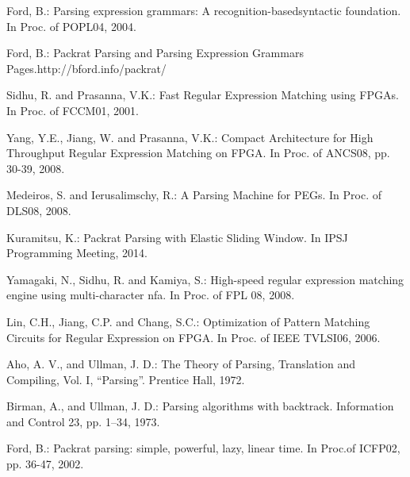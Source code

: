 \documentclass[submit,techrep]{ipsj}
\begin{document}
%
%

\begin{thebibliography}{99}

Ford, B.: Parsing expression grammars: A recognition-basedsyntactic foundation. In Proc. of POPL04, 2004.

Ford, B.: Packrat Parsing and Parsing Expression Grammars Pages.http://bford.info/packrat/

Sidhu, R. and Prasanna, V.K.: Fast Regular Expression Matching using FPGAs. In Proc. of FCCM01, 2001.

Yang, Y.E., Jiang, W. and Prasanna, V.K.: Compact Architecture for High Throughput Regular Expression Matching on FPGA. In Proc. of ANCS08, pp. 30-39, 2008.

Medeiros, S. and Ierusalimschy, R.: A Parsing Machine for PEGs. In Proc. of DLS08, 2008.

Kuramitsu, K.: Packrat Parsing with Elastic Sliding Window. In IPSJ Programming Meeting, 2014.

Yamagaki, N., Sidhu, R. and Kamiya, S.: High-speed regular expression matching engine using multi-character nfa. In Proc. of FPL 08, 2008.

Lin, C.H., Jiang, C.P. and Chang, S.C.: Optimization of Pattern Matching Circuits for Regular Expression on FPGA. In Proc. of IEEE TVLSI06, 2006.

Aho, A. V., and Ullman, J. D.: The Theory of Parsing, Translation and Compiling, Vol. I, “Parsing”. Prentice Hall, 1972.

Birman, A., and Ullman, J. D.: Parsing algorithms with backtrack. Information and Control 23, pp. 1–34, 1973.

Ford, B.: Packrat parsing: simple, powerful, lazy, linear time. In Proc.of ICFP02, pp. 36-47, 2002.



\end{thebibliography}
\end{document}

